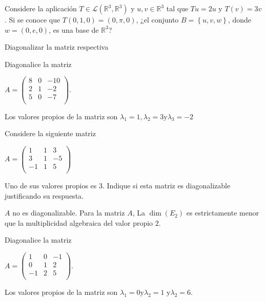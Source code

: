\documentclass[10pt,a4]{examenEPN}
\begin{document}
\begin{preguntas}
\item Considere la aplicaci\'on $T\in\mathscr{L}(\mathbb{R}^3,\mathbb{R}^3)$ y $u,v \in \mathbb{R}^3$ tal que $Tu=2u \text{ y } T(v)=3v$. Si se conoce que $T(0,1,0)=(0,\pi,0)$, ¿el conjunto 
$B=\left\{u,v,w\right\}$, donde $w=(0,e,0)$, es una base de $\mathbb{R}^3$?
\begin{respuesta}
Diagonalizar la matriz respectiva
\end{respuesta}
\item Diagonalice la matriz
\begin{center}
 $A = \left( \begin{matrix}
        8 & 0 & -10\\
        2 & 1 & -2\\
        5 & 0 &  -7\\
     \end{matrix}\right)$.   
\end{center}
\begin{respuesta}
Los valores propios de la matriz son $\lambda_1=1, \lambda_2=3 \text{y} \lambda_3=-2 $

\end{respuesta}
\item Considere la siguiente matriz 
\begin{center}
 $A = \left( \begin{matrix}
        1 & 1 & 3\\
        3 & 1 & -5\\
        -1 & 1 &  5\\
     \end{matrix}\right)$  
\end{center}
Uno de sus valores propios es $3$. Indique si esta matriz es diagonalizable justificando su respuesta.
\begin{respuesta}
$A$ no es diagonalizable. Para la matriz $A$, La $\dim(E_2)$ es estrictamente menor que la multiplicidad algebraica del valor propio $2$. 
\end{respuesta}
\item Diagonalice la matriz
\begin{center}
 $A = \left( \begin{matrix}
        1 & 0 & -1\\
        0 & 1 & 2\\
        -1 & 2 &  5\\
     \end{matrix}\right)$.   
\end{center}
\begin{respuesta}
Los valores propios de la matriz son $\lambda_1=0 \text{y} \lambda_2=1 \text{ y} \lambda_2=6$.


\end{respuesta}
\end{preguntas}
\end{document}

